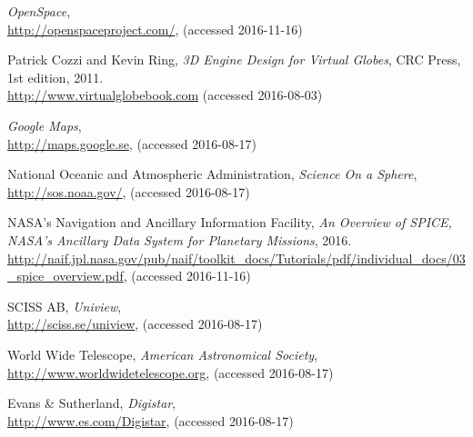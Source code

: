 \cleardoublepage
{}
{}
\begin{thebibliography}{99}



  \emph{OpenSpace},
  \\
  \url{http://openspaceproject.com/},
  (accessed 2016-11-16)

  Patrick Cozzi and Kevin Ring,
  \emph{3D Engine Design for Virtual Globes},
  CRC Press,
  1st edition,
  2011. \\
  \url{http://www.virtualglobebook.com}
  (accessed 2016-08-03)

  \emph{Google Maps},
  \\
  \url{http://maps.google.se},
  (accessed 2016-08-17)

  National Oceanic and Atmospheric Administration,
  \emph{Science On a Sphere},
  \\
  \url{http://sos.noaa.gov/},
  (accessed 2016-08-17)
  
  NASA's Navigation and Ancillary Information Facility,
  \emph{An Overview of SPICE, NASA's Ancillary Data System for Planetary Missions},
  2016. \\
  \url{http://naif.jpl.nasa.gov/pub/naif/toolkit_docs/Tutorials/pdf/individual_docs/03_spice_overview.pdf},
  (accessed 2016-11-16)

  SCISS AB,
  \emph{Uniview},
  \\
  \url{http://sciss.se/uniview},
  (accessed 2016-08-17)
  
  World Wide Telescope,
  \emph{American Astronomical Society},
  \\
  \url{http://www.worldwidetelescope.org},
  (accessed 2016-08-17)
  
  Evans \& Sutherland,
  \emph{Digistar},
  \\
  \url{http://www.es.com/Digistar},
  (accessed 2016-08-17)
  

\end{thebibliography}
